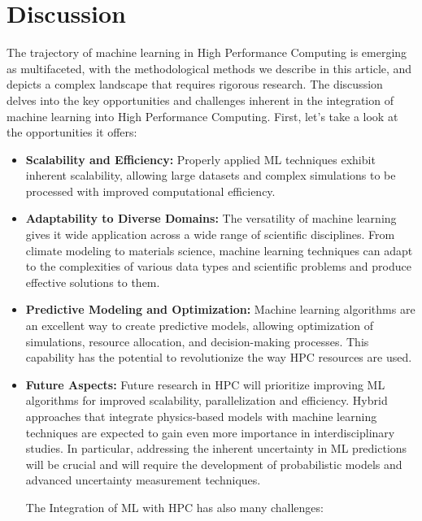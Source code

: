 \documentclass[conference]{IEEEtran}
\begin{document}
\section{Discussion}
The trajectory of machine learning in High Performance Computing is emerging as multifaceted, with the methodological methods we describe in this article, and depicts a complex landscape that requires rigorous research. The discussion delves into the key opportunities and challenges inherent in the integration of machine learning into High Performance Computing.
First, let's take a look at the opportunities it offers:

\begin{itemize}
\item \textbf{Scalability and Efficiency:} Properly applied ML techniques exhibit inherent scalability, allowing large datasets and complex simulations to be processed with improved computational efficiency.
\item \textbf{Adaptability to Diverse Domains:} The versatility of machine learning gives it wide application across a wide range of scientific disciplines. From climate modeling to materials science, machine learning techniques can adapt to the complexities of various data types and scientific problems and produce effective solutions to them.
\item \textbf{Predictive Modeling and Optimization:} Machine learning algorithms are an excellent way to create predictive models, allowing optimization of simulations, resource allocation, and decision-making processes. This capability has the potential to revolutionize the way HPC resources are used.
\item \textbf{Future Aspects:} Future research in HPC will prioritize improving ML algorithms for improved scalability, parallelization and efficiency. Hybrid approaches that integrate physics-based models with machine learning techniques are expected to gain even more importance in interdisciplinary studies. In particular, addressing the inherent uncertainty in ML predictions will be crucial and will require the development of probabilistic models and advanced uncertainty measurement techniques.

The Integration of ML with HPC has also many challenges:


\end{itemize}
\end{document}
